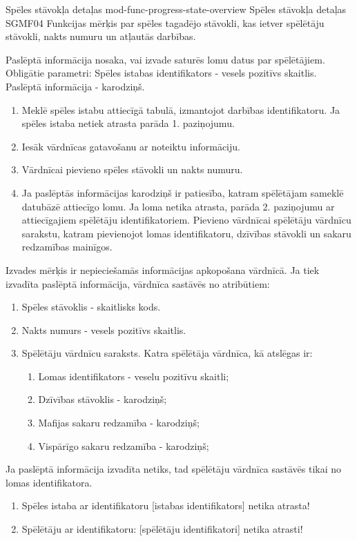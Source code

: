 \moduleFunctionTable
{Spēles stāvokļa detaļas}
{mod-func-progress-state-overview}
{Spēles stāvokļa detaļas}
{SGMF04}
{
	Funkcijas mērķis par spēles tagadējo stāvokli, kas ietver spēlētāju stāvokli, nakts numuru un atļautās darbības.
}
{
	Paslēptā informācija nosaka, vai izvade saturēs lomu datus par spēlētājiem.
	Obligātie parametri:
	Spēles istabas identifikators - vesels pozitīvs skaitlis.
	Paslēptā informācija - karodziņš.

}
{
	\begin{enumerate}
		\item Meklē spēles istabu attiecīgā tabulā, izmantojot darbības identifikatoru.
		      Ja spēles istaba netiek atrasta parāda 1. paziņojumu.
		\item Iesāk vārdnīcas gatavošanu ar noteiktu informāciju.
		\item Vārdnīcai pievieno spēles stāvokli un nakts numuru.
		\item Ja paslēptās informācijas karodziņš ir patiesība, katram spēlētājam sameklē datubāzē attiecīgo lomu.
		      Ja loma netika atrasta, parāda 2. paziņojumu ar attiecīgajiem spēlētāju identifikatoriem.
		      Pievieno vārdnīcai spēlētāju vārdnīcu sarakstu, katram pievienojot lomas identifikatoru, dzīvības stāvokli un sakaru redzamības mainīgos.
	\end{enumerate}
}
{
	Izvades mērķis ir nepieciešamās informācijas apkopošana vārdnīcā.
	Ja tiek izvadīta paslēptā informācija, vārdnīca sastāvēs no atribūtiem:
	\begin{enumerate}
		\item Spēles stāvoklis - skaitlisks kods.
		\item Nakts numurs - vesels pozitīvs skaitlis.
		\item Spēlētāju vārdnīcu saraksts. Katra spēlētāja vārdnīca, kā atslēgas ir:
		      \begin{enumerate}
			      \item Lomas identifikators - veselu pozitīvu skaitli;
			      \item Dzīvības stāvoklis - karodziņš;
			      \item Mafijas sakaru redzamība - karodziņš;
			      \item Vispārīgo sakaru redzamība - karodziņš;
		      \end{enumerate}

	\end{enumerate}
	Ja paslēptā informācija izvadīta netiks, tad spēlētāju vārdnīca sastāvēs tikai no lomas identifikatora.
}
{
	\begin{enumerate}
		\item Spēles istaba ar identifikatoru [istabas identifikators] netika atrasta!
		\item Spēlētāju ar identifikatoru: [spēlētāju identifikatori] netika atrasti!
	\end{enumerate}
}
